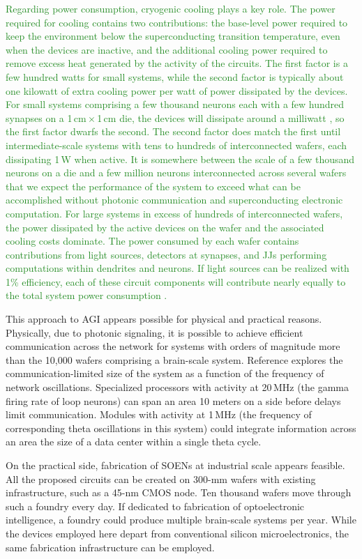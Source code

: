 \documentclass[twocolumn]{article}
\newcommand{\onlinecite}[1]{\hspace{-1 ex} \nocite{#1}\citenum{#1}}
\begin{document}
\textcolor{ForestGreen}{Regarding power consumption, cryogenic cooling plays a key role. The power required for cooling  contains two contributions: the base-level power required to keep the environment below the superconducting transition temperature, even when the devices are inactive, and the additional cooling power required to remove excess heat generated by the activity of the circuits. The first factor is a few hundred watts for small systems, while the second factor is typically about one kilowatt of extra cooling power per watt of power dissipated by the devices. For small systems comprising a few thousand neurons each with a few hundred synapses on a 1\,cm\,$\times$\,1\,cm die, the devices will dissipate around a milliwatt \cite{sh2019}, so the first factor dwarfs the second. The second factor does match the first until intermediate-scale systems with tens to hundreds of interconnected wafers, each dissipating 1\,W when active. It is somewhere between the scale of a few thousand neurons on a die and a few million neurons interconnected across several wafers that we expect the performance of the system to exceed what can be accomplished without photonic communication and superconducting electronic computation. For large systems in excess of hundreds of interconnected wafers, the power dissipated by the active devices on the wafer and the associated cooling costs dominate. The power consumed by each wafer contains contributions from light sources, detectors at synapses, and JJs performing computations within dendrites and neurons. If light sources can be realized with 1\% efficiency, each of these circuit components will contribute nearly equally to the total system power consumption \cite{sh2020}.}

This approach to AGI appears possible for physical and practical reasons. Physically, due to photonic signaling, it is possible to achieve efficient communication across the network for systems with orders of magnitude more than the 10,000 wafers comprising a brain-scale system. Reference \onlinecite{sh2019} explores the communication-limited size of the system as a function of the frequency of network oscillations. Specialized processors with activity at 20\,MHz (the gamma firing rate of loop neurons) can span an area 10 meters on a side before delays limit communication. Modules with activity at 1\,MHz (the frequency of corresponding theta oscillations in this system) could integrate information across an area the size of a data center within a single theta cycle.

On the practical side, fabrication of SOENs at industrial scale appears feasible. All the proposed circuits can be created on 300-mm wafers with existing infrastructure, such as a 45-nm CMOS node. Ten thousand wafers move through such a foundry every day. If dedicated to fabrication of optoelectronic intelligence, a foundry could produce multiple brain-scale systems per year. While the devices employed here depart from conventional silicon microelectronics, the same fabrication infrastructure can be employed.
\end{document}
